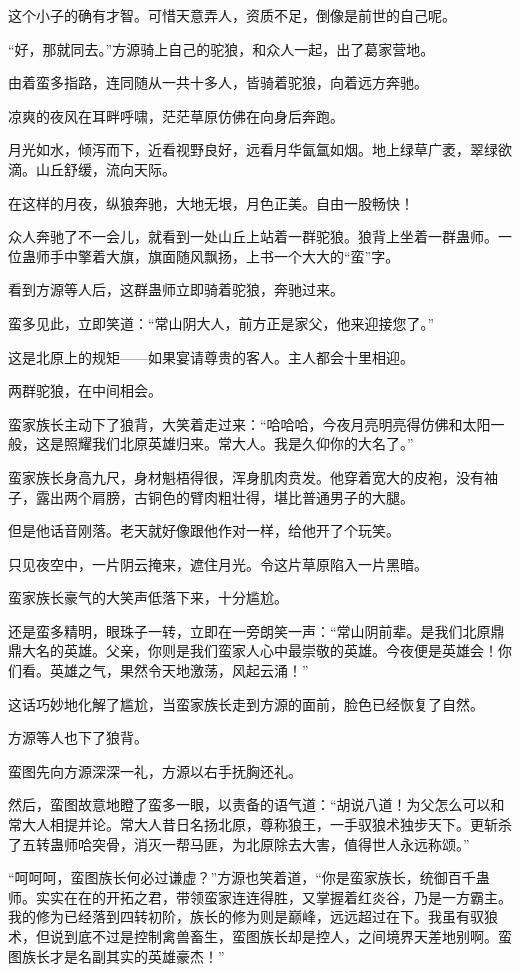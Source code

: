 \begin{this_body}
这个小子的确有才智。可惜天意弄人，资质不足，倒像是前世的自己呢。

“好，那就同去。”方源骑上自己的驼狼，和众人一起，出了葛家营地。

由着蛮多指路，连同随从一共十多人，皆骑着驼狼，向着远方奔驰。

凉爽的夜风在耳畔呼啸，茫茫草原仿佛在向身后奔跑。

月光如水，倾泻而下，近看视野良好，远看月华氤氲如烟。地上绿草广袤，翠绿欲滴。山丘舒缓，流向天际。

在这样的月夜，纵狼奔驰，大地无垠，月色正美。自由一股畅快！

众人奔驰了不一会儿，就看到一处山丘上站着一群驼狼。狼背上坐着一群蛊师。一位蛊师手中擎着大旗，旗面随风飘扬，上书一个大大的“蛮”字。

看到方源等人后，这群蛊师立即骑着驼狼，奔驰过来。

蛮多见此，立即笑道：“常山阴大人，前方正是家父，他来迎接您了。”

这是北原上的规矩——如果宴请尊贵的客人。主人都会十里相迎。

两群驼狼，在中间相会。

蛮家族长主动下了狼背，大笑着走过来：“哈哈哈，今夜月亮明亮得仿佛和太阳一般，这是照耀我们北原英雄归来。常大人。我是久仰你的大名了。”

蛮家族长身高九尺，身材魁梧得很，浑身肌肉贲发。他穿着宽大的皮袍，没有袖子，露出两个肩膀，古铜色的臂肉粗壮得，堪比普通男子的大腿。

但是他话音刚落。老天就好像跟他作对一样，给他开了个玩笑。

只见夜空中，一片阴云掩来，遮住月光。令这片草原陷入一片黑暗。

蛮家族长豪气的大笑声低落下来，十分尴尬。

还是蛮多精明，眼珠子一转，立即在一旁朗笑一声：“常山阴前辈。是我们北原鼎鼎大名的英雄。父亲，你则是我们蛮家人心中最崇敬的英雄。今夜便是英雄会！你们看。英雄之气，果然令天地激荡，风起云涌！”

这话巧妙地化解了尴尬，当蛮家族长走到方源的面前，脸色已经恢复了自然。

方源等人也下了狼背。

蛮图先向方源深深一礼，方源以右手抚胸还礼。

然后，蛮图故意地瞪了蛮多一眼，以责备的语气道：“胡说八道！为父怎么可以和常大人相提并论。常大人昔日名扬北原，尊称狼王，一手驭狼术独步天下。更斩杀了五转蛊师哈突骨，消灭一帮马匪，为北原除去大害，值得世人永远称颂。”

“呵呵呵，蛮图族长何必过谦虚？”方源也笑着道，“你是蛮家族长，统御百千蛊师。实实在在的开拓之君，带领蛮家连连得胜，又掌握着红炎谷，乃是一方霸主。我的修为已经落到四转初阶，族长的修为则是巅峰，远远超过在下。我虽有驭狼术，但说到底不过是控制禽兽畜生，蛮图族长却是控人，之间境界天差地别啊。蛮图族长才是名副其实的英雄豪杰！”


\end{this_body}
